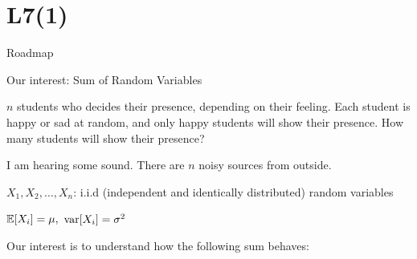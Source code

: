 \section{L7(1)}
\begin{frame}{Roadmap}

\plitemsep 0.15in

\bce[(1)]

\item {}
\item {}

\ece

\end{frame}


\begin{frame}{Our interest: Sum of Random Variables}

\plitemsep 0.1in

\bci

\item<1->  $n$ students who decides their presence, depending on their feeling. Each student is happy or sad at random, and only happy students will show their presence. How many students will show their presence?

\item<2->  I am hearing some sound. There are $n$ noisy sources from outside.

\bigskip

\item<3-> $X_1, X_2, \ldots, X_n$: i.i.d (independent and identically distributed) random variables

\item<4-> $\mathbb{E}[ X_i ] = \mu,$ $\text{var}[ X_i ] = \sigma^2$

\item<5-> Our interest is to understand how the following sum behaves:
\eci

\end{frame}

